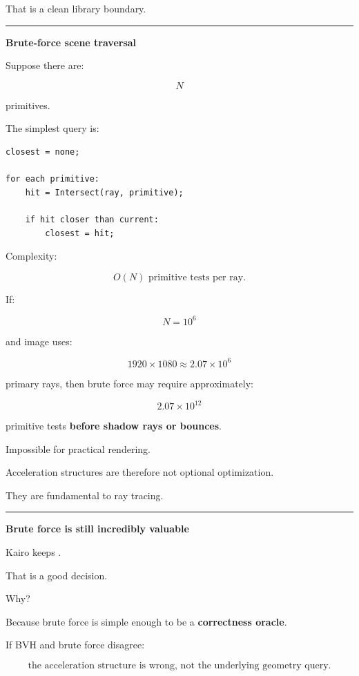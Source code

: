 That is a clean library boundary.

\begin{center}\rule{0.5\linewidth}{0.5pt}\end{center}

\textbf{Brute-force scene traversal}

Suppose there are:

\[
N
\]

primitives.

The simplest query is:

\begin{verbatim}
closest = none;

for each primitive:
    hit = Intersect(ray, primitive);

    if hit closer than current:
        closest = hit;
\end{verbatim}

Complexity:

\[
\boxed{O(N)\text{ primitive tests per ray}.}
\]

If:

\[
N=10^6
\]

and image uses:

\[
1920\times1080
\approx2.07\times10^6
\]

primary rays, then brute force may require approximately:

\[
2.07\times10^{12}
\]

primitive tests \textbf{before shadow rays or bounces}.

Impossible for practical rendering.

Acceleration structures are therefore not optional optimization.

They are fundamental to ray tracing.

\begin{center}\rule{0.5\linewidth}{0.5pt}\end{center}

\textbf{Brute force is still incredibly valuable}

Kairo keeps .

That is a good decision.

Why?

Because brute force is simple enough to be a \textbf{correctness oracle}.

If BVH and brute force disagree:

\[
\boxed{
\text{the acceleration structure is wrong, not the underlying geometry query}.
}
\]

